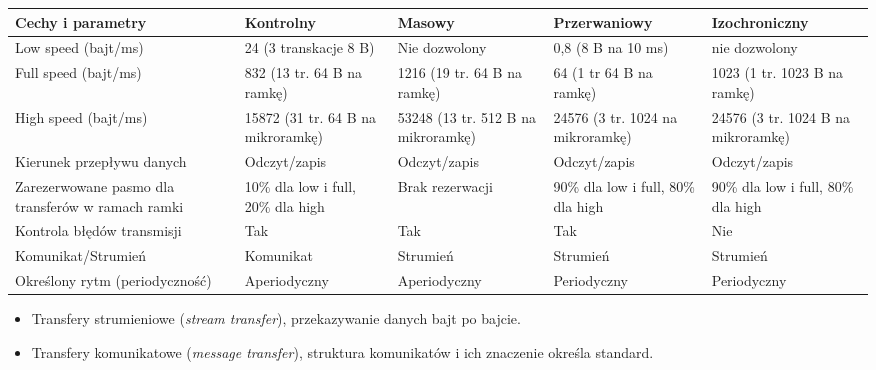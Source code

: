 		\begin{table}[h]
			\begin{tabular}{|p{4cm}|p{3cm}|p{3cm}|p{3cm}|p{3cm}|}
				\hline
				\textbf{Cechy i parametry} & \textbf{Kontrolny}	   & \textbf{Masowy} & \textbf{Przerwaniowy} & \textbf{Izochroniczny} \\ \hline
				Low speed (bajt/ms)  & 24 (3 transkacje 8 B)        & Nie dozwolony      			& 0,8 (8 B na 10 ms)		& nie dozwolony						\\ \hline
				Full speed (bajt/ms) & 832 (13 tr. 64 B na ramkę)   & 1216 (19 tr. 64 B na ramkę)   & 64 (1 tr 64 B na ramkę)	& 1023 (1 tr. 1023 B na ramkę)		\\ \hline
				High speed (bajt/ms) & 15872 (31 tr. 64 B na mikroramkę) & 53248 (13 tr. 512 B na mikroramkę) & 24576 (3 tr. 1024 na mikroramkę)	& 24576 (3 tr. 1024 B na mikroramkę)	\\ \hline
				Kierunek przepływu danych & Odczyt/zapis            & Odczyt/zapis       			& Odczyt/zapis		& Odczyt/zapis					\\ \hline
				Zarezerwowane pasmo  dla transferów w ramach ramki & 10\% dla low i full, 20\% dla high   & Brak rezerwacji  & 90\% dla low i full, 80\% dla high	& 90\% dla low i full, 80\% dla high	\\ \hline
				Kontrola błędów transmisji & Tak                	& Tak & Tak	& Nie	\\ \hline
				Komunikat/Strumień  & Komunikat		               & Strumień & Strumień   & Strumień	\\ \hline
				Określony rytm (periodyczność) & Aperiodyczny        & Aperiodyczny    & Periodyczny   & Periodyczny	\\ \hline
				\end{tabular}
		\end{table}
				\begin{itemize}
					\item Transfery strumieniowe (\emph{stream transfer}), przekazywanie danych bajt po bajcie.
					\item Transfery komunikatowe (\emph{message transfer}), struktura komunikatów i ich znaczenie określa standard.
				\end{itemize}
				
